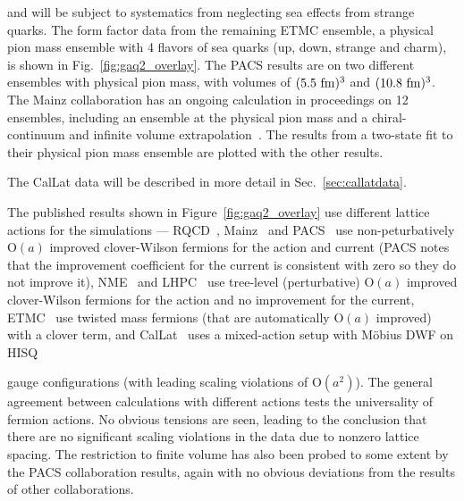 \documentclass{ar-1col}
\begin{document}
 and will be subject to systematics from neglecting sea effects from strange quarks.
The form factor data from the remaining ETMC ensemble,
 a physical pion mass ensemble with 4 flavors of sea quarks (up, down, strange and charm),
 is shown in Fig.~\ref{fig:gaq2_overlay}.
The PACS results are on two different ensembles with physical pion mass,
 with volumes of $(5.5~{\rm fm})^3$ and $(10.8~{\rm fm})^3$.
The Mainz collaboration has an ongoing calculation in proceedings on 12 ensembles,
 including an ensemble at the physical pion mass
 and a chiral-continuum and infinite volume extrapolation~\cite{Djukanovic:2021yqg}.
The results from a two-state fit to their physical pion mass ensemble
 are plotted with the other results.%
\begin{marginnote}
\end{marginnote}%
The CalLat data will be described in more detail in Sec.~\ref{sec:callatdata}.


The published results shown in Figure~\ref{fig:gaq2_overlay} use different lattice actions for the simulations ---
RQCD~\cite{RQCD:2019jai}, Mainz~\cite{Djukanovic:2021yqg} and PACS~\cite{Ishikawa:2018rew,Shintani:2018ozy,Ishikawa:2021eut} use non-peturbatively $\mathrm{O}(a)$ improved clover-Wilson fermions for the action and current (PACS notes that the improvement coefficient for the current is consistent with zero so they do not improve it),
NME~\cite{Park:2021ypf} and LHPC~\cite{Hasan:2017wwt} use tree-level (perturbative) $\mathrm{O}(a)$ improved clover-Wilson fermions for the action and no improvement for the current,
 ETMC~\cite{Alexandrou:2020okk} use twisted mass fermions (that are automatically $\mathrm{O}(a)$ improved) with a clover term,
 and CalLat~\cite{Meyer:2021vfq} uses a mixed-action setup with M\"obius DWF
 on HISQ~\cite{MILC:2012znn}%
 \begin{marginnote}
 \end{marginnote}%
 gauge configurations (with leading scaling violations of $\mathrm{O}(a^2)$).
The general agreement between calculations with different actions tests
 the universality of fermion actions.
No obvious tensions are seen,
 leading to the conclusion that there are no significant scaling violations
 in the data due to nonzero lattice spacing.
The restriction to finite volume has also been probed to some extent by
 the PACS collaboration results,
 again with no obvious deviations from the results of other collaborations.
\end{document}
